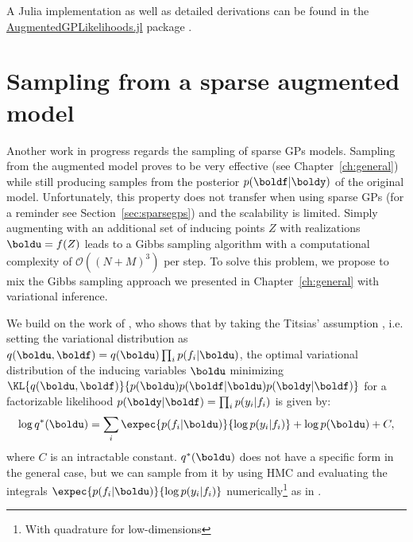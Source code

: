 A Julia implementation as well as detailed derivations can be found in the \href{https://github.com/JuliaGaussianProcesses/AugmentedGPLikelihoods.jl}{AugmentedGPLikelihoods.jl} package \cite{theo_galy_fajou_2022_6347022}.

\section{Sampling from a sparse augmented model}

Another work in progress regards the sampling of sparse \ac{GPs} models.
Sampling from the augmented model proves to be very effective (see Chapter~\ref{ch:general}) while still producing samples from the posterior $p(\boldf|\boldy)$ of the original model.
Unfortunately, this property does not transfer when using sparse \ac{GPs} (for a reminder see Section~\ref{sec:sparsegps}) and the scalability is limited.
Simply augmenting with an additional set of inducing points $Z$ with realizations $\boldu = f(Z)$ leads to a Gibbs sampling algorithm with a computational complexity of $\mathcal{O}((N+M)^3)$ per step.
To solve this problem, we propose to mix the Gibbs sampling approach we presented in Chapter~\ref{ch:general} with variational inference.

We build on the work of \citet{hensmanMCMCVariationallySparse2015}, who shows that by taking the Titsias' assumption \cite{Titsias2009}, i.e. setting the variational distribution as $q(\boldu,\boldf) = q(\boldu)\prod_i p(f_i|\boldu)$, the optimal variational distribution of the inducing variables $\boldu$ minimizing $\KL{q(\boldu, \boldf)}{p(\boldu)p(\boldf|\boldu)p(\boldy|\boldf)}$ for a factorizable likelihood $p(\boldy|\boldf)=\prod_i p(y_i|f_i)$ is given by:
\begin{align}
    \log q^*(\boldu) = \sum_{i}\expec{p(f_i|\boldu)}{\log p(y_i|f_i)} + \log p(\boldu) + C,\label{eq:obj_hensman}
\end{align}
where $C$ is an intractable constant.
$q^*(\boldu)$ does not have a specific form in the general case, but we can sample from it by using \ac{HMC} and evaluating the integrals $\expec{p(f_i|\boldu)}{\log p(y_i|f_i)}$ numerically\footnote{With quadrature for low-dimensions} as in \cite{hensmanMCMCVariationallySparse2015}.

